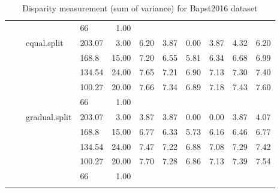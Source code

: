 \begin{longtable}{llllrrrrrrr}
   &  &  & 66 & 1.00 &  &  &  &  &  &  \\ 
   &  & equal.split & 203.07 & 3.00 & 6.20 & 3.87 & 0.00 & 3.87 & 4.32 & 6.20 \\ 
   &  &  & 168.8 & 15.00 & 7.20 & 6.55 & 5.81 & 6.34 & 6.68 & 6.99 \\ 
   &  &  & 134.54 & 24.00 & 7.65 & 7.21 & 6.90 & 7.13 & 7.30 & 7.40 \\ 
   &  &  & 100.27 & 20.00 & 7.66 & 7.34 & 6.89 & 7.18 & 7.43 & 7.60 \\ 
   &  &  & 66 & 1.00 &  &  &  &  &  &  \\ 
   &  & gradual.split & 203.07 & 3.00 & 3.87 & 3.87 & 0.00 & 0.00 & 3.87 & 4.07 \\ 
   &  &  & 168.8 & 15.00 & 6.77 & 6.33 & 5.73 & 6.16 & 6.46 & 6.77 \\ 
   &  &  & 134.54 & 24.00 & 7.47 & 7.22 & 6.88 & 7.08 & 7.29 & 7.42 \\ 
   &  &  & 100.27 & 20.00 & 7.70 & 7.28 & 6.86 & 7.13 & 7.39 & 7.54 \\ 
   &  &  & 66 & 1.00 &  &  &  &  &  &  \\ 
   \hline
\hline
\caption{Disparity measurement (sum of variance) for Bapst2016 dataset} 
\end{longtable}

